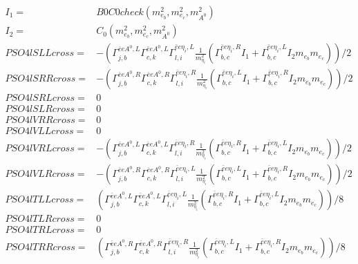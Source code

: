 \documentclass[A4,landscape]{article}
\begin{document}
\begin{align} 
I_1= & B0C0check(m^2_{e_{{b}}}, m^2_{e_{{c}}}, m^2_{A^0}) \\ 
I_2= & C_0(m^2_{e_{{b}}}, m^2_{e_{{c}}}, m^2_{A^0}) \\ 
  PSO4lSLLcross= & -( \Gamma^{\bar{e}e A^0 ,L}_{j, b} \Gamma^{\bar{e}e A^0 ,L}_{c, k} \Gamma^{\bar{e}e \eta_i ,L}_{l, i} \frac{1}{m^2_{\eta_i}} (\Gamma^{\bar{e}e \eta_i ,R}_{b, c} I_1 + \Gamma^{\bar{e}e \eta_i ,L}_{b, c} I_2 m_{e_{{b}}} m_{e_{{c}}}))/2 \\ 
  PSO4lSRRcross= & -( \Gamma^{\bar{e}e A^0 ,R}_{j, b} \Gamma^{\bar{e}e A^0 ,R}_{c, k} \Gamma^{\bar{e}e \eta_i ,R}_{l, i} \frac{1}{m^2_{\eta_i}} (\Gamma^{\bar{e}e \eta_i ,L}_{b, c} I_1 + \Gamma^{\bar{e}e \eta_i ,R}_{b, c} I_2 m_{e_{{b}}} m_{e_{{c}}}))/2 \\ 
  PSO4lSRLcross= & 0 \\ 
  PSO4lSLRcross= & 0 \\ 
  PSO4lVRRcross= & 0 \\ 
  PSO4lVLLcross= & 0 \\ 
  PSO4lVRLcross= & -( \Gamma^{\bar{e}e A^0 ,L}_{j, b} \Gamma^{\bar{e}e A^0 ,L}_{c, k} \Gamma^{\bar{e}e \eta_i ,R}_{l, i} \frac{1}{m^2_{\eta_i}} (\Gamma^{\bar{e}e \eta_i ,R}_{b, c} I_1 + \Gamma^{\bar{e}e \eta_i ,L}_{b, c} I_2 m_{e_{{b}}} m_{e_{{c}}}))/2 \\ 
  PSO4lVLRcross= & -( \Gamma^{\bar{e}e A^0 ,R}_{j, b} \Gamma^{\bar{e}e A^0 ,R}_{c, k} \Gamma^{\bar{e}e \eta_i ,L}_{l, i} \frac{1}{m^2_{\eta_i}} (\Gamma^{\bar{e}e \eta_i ,L}_{b, c} I_1 + \Gamma^{\bar{e}e \eta_i ,R}_{b, c} I_2 m_{e_{{b}}} m_{e_{{c}}}))/2 \\ 
  PSO4lTLLcross= & ( \Gamma^{\bar{e}e A^0 ,L}_{j, b} \Gamma^{\bar{e}e A^0 ,L}_{c, k} \Gamma^{\bar{e}e \eta_i ,L}_{l, i} \frac{1}{m^2_{\eta_i}} (\Gamma^{\bar{e}e \eta_i ,R}_{b, c} I_1 + \Gamma^{\bar{e}e \eta_i ,L}_{b, c} I_2 m_{e_{{b}}} m_{e_{{c}}}))/8 \\ 
  PSO4lTLRcross= & 0 \\ 
  PSO4lTRLcross= & 0 \\ 
  PSO4lTRRcross= & ( \Gamma^{\bar{e}e A^0 ,R}_{j, b} \Gamma^{\bar{e}e A^0 ,R}_{c, k} \Gamma^{\bar{e}e \eta_i ,R}_{l, i} \frac{1}{m^2_{\eta_i}} (\Gamma^{\bar{e}e \eta_i ,L}_{b, c} I_1 + \Gamma^{\bar{e}e \eta_i ,R}_{b, c} I_2 m_{e_{{b}}} m_{e_{{c}}}))/8 \\ 
\end{align} 
\end{document}
